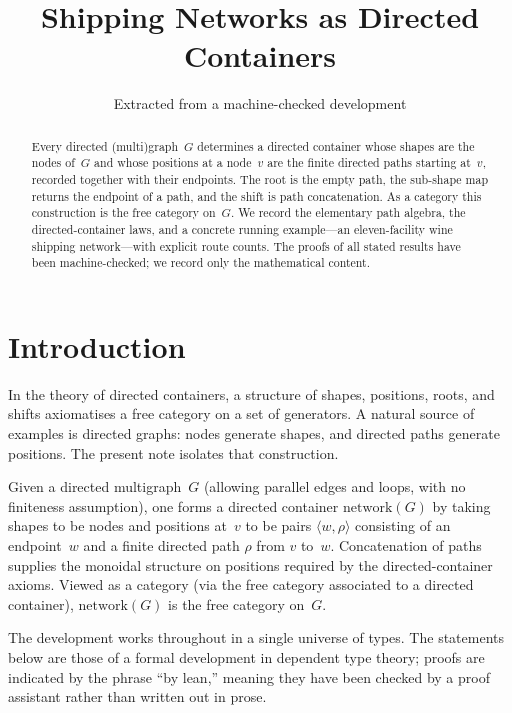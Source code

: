 \documentclass[11pt,a4paper]{article}
\title{Shipping Networks as Directed Containers}
\author{Extracted from a machine-checked development}
\date{}
\theoremstyle{plain}
\theoremstyle{definition}
\begin{document}
\maketitle

\begin{abstract}
Every directed (multi)graph~$G$ determines a directed container whose shapes
are the nodes of~$G$ and whose positions at a node~$v$ are the finite directed
paths starting at~$v$, recorded together with their endpoints. The root is the
empty path, the sub-shape map returns the endpoint of a path, and the shift is
path concatenation. As a category this construction is the free category
on~$G$. We record the elementary path algebra, the directed-container laws, and
a concrete running example---an eleven-facility wine shipping network---with
explicit route counts. The proofs of all stated results have been
machine-checked; we record only the mathematical content.
\end{abstract}

\tableofcontents
\bigskip

\section{Introduction}

In the theory of directed containers, a structure of shapes, positions, roots,
and shifts axiomatises a free category on a set of generators. A natural source
of examples is directed graphs: nodes generate shapes, and directed paths
generate positions. The present note isolates that construction.

Given a directed multigraph~$G$ (allowing parallel edges and loops, with no
finiteness assumption), one forms a directed container $\mathrm{network}(G)$
by taking shapes to be nodes and positions at~$v$ to be pairs $\langle w,\rho
\rangle$ consisting of an endpoint~$w$ and a finite directed path $\rho$ from
$v$ to~$w$. Concatenation of paths supplies the monoidal structure on positions
required by the directed-container axioms. Viewed as a category (via the free
category associated to a directed container), $\mathrm{network}(G)$ is the free
category on~$G$.

The development works throughout in a single universe of types. The statements
below are those of a formal development in dependent type theory; proofs are
indicated by the phrase ``by lean,'' meaning they have been checked by a proof
assistant rather than written out in prose.
\end{document}
